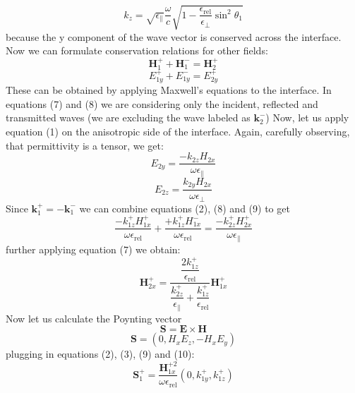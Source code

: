 \documentclass[a4paper]{scrartcl}
\begin{document}
\begin{equation}
      k_z =
      \sqrt{\epsilon_\parallel}\dfrac{\omega}{c}\sqrt{1-\dfrac{\epsilon_\textrm{rel}}{\epsilon_\bot}\sin^2\theta_1}
\end{equation}
because the y component of the wave vector is conserved across the interface. Now we can formulate conservation
relations for other fields:
\begin{equation}
      \mathbf{H}_1^+ + \mathbf{H}_1^- = \mathbf{H}_2^+
\end{equation}
\begin{equation}
      E_{1y}^+ + E_{1y}^- = E_{2y}^+
\end{equation}
These can be obtained by applying Maxwell's equations to the interface. In equations (7) and (8) we are considering only
the incident, reflected and transmitted waves (we are excluding the wave labeled as $\mathbf{k}_2^-$)
Now, let us apply equation (1) on the anisotropic side of the interface. Again, carefully observing, that permittivity
is a tensor, we get:
\begin{equation}
      E_{2y} = \dfrac{-k_{2z} H_{2x}}{\omega \epsilon_\parallel}
\end{equation}
\begin{equation}
      E_{2z} = \dfrac{k_{2y} H_{2x}}{\omega \epsilon_\bot}
\end{equation}
Since $\mathbf{k}_1^+ = -\mathbf{k}_1^-$ we can combine equations (2), (8) and (9) to get
\begin{equation}
\dfrac{-k_{1z}^+ H_{1x}^+}{\omega \epsilon_\textrm{rel}} + \dfrac{+k_{1z}^+ H_{1x}^-}{\omega \epsilon_\textrm{rel}} =
\dfrac{-k_{2z}^+ H_{2x}^+}{\omega \epsilon_\parallel}
\end{equation}
further applying equation (7) we obtain:
\begin{equation}
      \mathbf{H}_{2x}^+ =
      \dfrac{\dfrac{2k_{1z}^+}{\epsilon_\textrm{rel}}}{\dfrac{k_{2z}^+}{\epsilon_\parallel} +
      \dfrac{k_{1z}^+}{\epsilon_\textrm{rel}}} \mathbf{H}_{1x}^+
\end{equation}
Now let us calculate the Poynting vector
\begin{equation}
      \mathbf{S} = \mathbf{E} \times \mathbf{H}
\end{equation}
\begin{equation}
      \mathbf{S} = (0,H_x E_z, -H_x E_y)
\end{equation}
plugging in equations (2), (3), (9) and (10):
\begin{equation}
      \mathbf{S}_1^+ = \dfrac{\mathbf{H}_{1x}^{+2}}{\omega\epsilon_{\textrm{rel}}}(0,k_{1y}^+, k_{1z}^+)
\end{equation}
\end{document}
